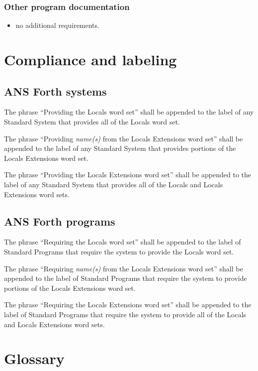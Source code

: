 \subsubsection{Other program documentation} %
\begin{itemize}
\item no additional requirements.
\end{itemize}


\section{Compliance and labeling} %

\subsection{ANS Forth systems} %

The phrase ``Providing the Locals word set'' shall be appended to
the label of any Standard System that provides all of the Locals
word set.

The phrase ``Providing \emph{name(s)} from the Locals Extensions
word set'' shall be appended to the label of any Standard System
that provides portions of the Locals Extensions word set.

The phrase ``Providing the Locals Extensions word set'' shall be
appended to the label of any Standard System that provides all of
the Locals and Locals Extensions word sets.

\subsection{ANS Forth programs} %

The phrase ``Requiring the Locals word set'' shall be appended to
the label of Standard Programs that require the system to provide
the Locals word set.

The phrase ``Requiring \emph{name(s)} from the Locals Extensions
word set'' shall be appended to the label of Standard Programs that
require the system to provide portions of the Locals Extensions word
set.

The phrase ``Requiring the Locals Extensions word set'' shall be
appended to the label of Standard Programs that require the system
to provide all of the Locals and Locals Extensions word sets.


\section{Glossary} %


